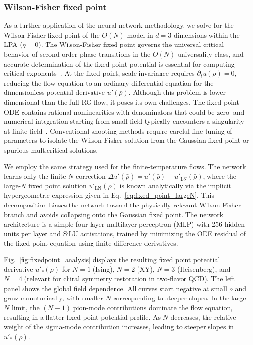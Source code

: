 \documentclass[reprint,twocolumn,superscriptaddress,preprintnumbers,amsmath,amssymb,aps,prd,floatfix]{revtex4-2}
\def\Fig#1{Fig.~\ref{#1}}
\begin{document}
\subsubsection{Wilson-Fisher fixed point}

As a further application of the neural network methodology, we solve for the Wilson-Fisher fixed point of the $O(N)$ model in $d=3$ dimensions within the LPA ($\eta=0$). The Wilson-Fisher fixed point governs the universal critical behavior of second-order phase transitions in the $O(N)$ universality class, and accurate determination of the fixed point potential is essential for computing critical exponents~\cite{Tan:2024fuq}. At the fixed point, scale invariance requires $\partial_t u(\bar{\rho})=0$, reducing the flow equation to an ordinary differential equation for the dimensionless potential derivative $u'(\bar{\rho})$. Although this problem is lower-dimensional than the full RG flow, it poses its own challenges. The fixed point ODE contains rational nonlinearities with denominators that could be zero, and numerical integration starting from small field typically encounters a singularity at finite field~\cite{Tan:2022ksv}. Conventional shooting methods require careful fine-tuning of parameters to isolate the Wilson-Fisher solution from the Gaussian fixed point or spurious multicritical solutions.

We employ the same strategy used for the finite-temperature flows. The network learns only the finite-$N$ correction $\Delta u'(\bar{\rho}) = u'(\bar{\rho}) - u'_{\mathrm{LN}}(\bar{\rho})$, where the large-$N$ fixed point solution $u'_{\mathrm{LN}}(\bar{\rho})$ is known analytically via the implicit hypergeometric expression given in Eq.~\eqref{eq:fixed_point_largeN}. This decomposition biases the network toward the physically relevant Wilson-Fisher branch and avoids collapsing onto the Gaussian fixed point. The network architecture is a simple four-layer multilayer perceptron (MLP) with 256 hidden units per layer and SiLU activations, trained by minimizing the ODE residual of the fixed point equation using finite-difference derivatives.


\Fig{fig:fixedpoint_analysis} displays the resulting fixed point potential derivative $u'_*(\bar{\rho})$ for $N=1$ (Ising), $N=2$ (XY), $N=3$ (Heisenberg), and $N=4$ (relevant for chiral symmetry restoration in two-flavor QCD). The left panel shows the global field dependence. All curves start negative at small $\bar{\rho}$ and grow monotonically, with smaller $N$ corresponding to steeper slopes. In the large-$N$ limit, the $(N-1)$ pion-mode contributions dominate the flow equation, resulting in a flatter fixed point potential profile. As $N$ decreases, the relative weight of the sigma-mode contribution increases, leading to steeper slopes in $u'_*(\bar{\rho})$.
\end{document}
